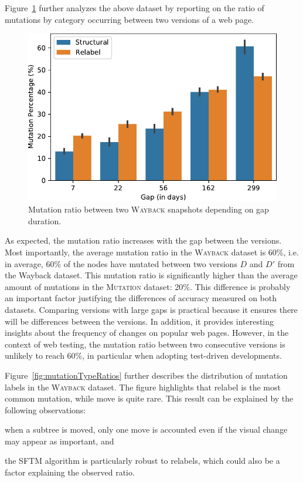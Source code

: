 \vspace{6pt}
Figure~\ref{fig:mutationAmountAnalysis} further analyzes the above dataset by reporting on the ratio of mutations by category occurring between two versions of a web page.

\begin{figure}[]
  \centering
  \includegraphics[width=.8\linewidth]{erratum/mutationAmountAnalysis}
  \caption{Mutation ratio between two \textsc{Wayback} snapshots depending on gap duration.}
  \label{fig:mutationAmountAnalysis}
\end{figure}

As expected, the mutation ratio increases with the gap between the versions.
Most importantly, the average mutation ratio in the \textsc{Wayback} dataset is
60\%, i.e. in average, 60\% of the nodes have mutated between two versions $D$
and $D'$ from the Wayback dataset. This mutation ratio is significantly higher
than the average amount of mutations in the \textsc{Mutation} dataset: 20\%.
This difference is probably an important factor justifying the differences of
accuracy measured on both datasets.
% 
Comparing versions with large gaps is practical because it ensures there will be
differences between the versions.
In addition, it provides interesting insights about the frequency of changes on popular web pages.
However, in the context of web testing, the mutation ratio between two consecutive versions is unlikely to reach 60\%, in particular when adopting test-driven developments.

\vspace{6pt}
Figure~\ref{fig:mutationTypeRatios} further describes the distribution of mutation labels in the \textsc{Wayback} dataset.
The figure highlights that \textsf{relabel} is the most common mutation, while \textsf{move} is quite rare.
This result can be explained by the following observations:
\begin{inparaenum}
  \item when a subtree is moved, only one move is accounted even if the visual change may appear as important, and
  \item the SFTM algorithm is particularly robust to relabels, which could also be a factor explaining the observed ratio.
\end{inparaenum}

